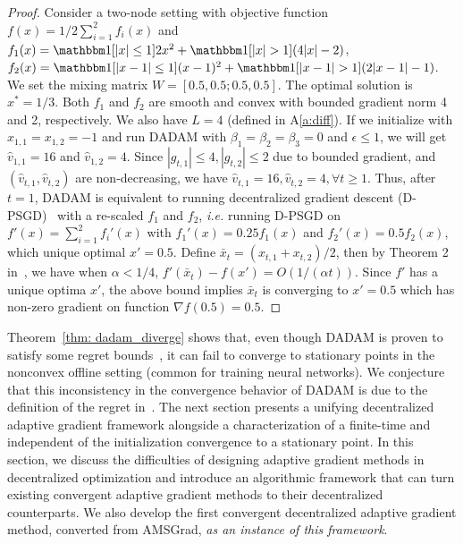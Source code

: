 \documentclass[anon,12pt]{colt2021} %
\begin{document}
\vspace{-0.05in}

\begin{proof}
Consider a two-node setting with objective function $f(x) =1/2 \sum_{i=1}^2 f_i(x)$ and $f_1(x) =  \mathbbm 1[|x|\leq 1] 2x^2 +  \mathbbm 1[|x|> 1] (4|x|-2)$, $f_2(x) =  \mathbbm 1[|x-1|\leq 1](x-1)^2 + \mathbbm 1[|x-1| > 1] (2|x-1|-1)$. We set the mixing matrix  $W = [0.5,0.5;0.5,0.5]$. The optimal solution is $x^* = 1/3$.
Both $f_1$ and $f_2$ are smooth and convex with bounded gradient norm 4 and 2, respectively. 
We also have $L = 4$ (defined in A\ref{a:diff}). 
If we initialize with $x_{1,1} = x_{1,2} = -1$ and run DADAM with $\beta_1 = \beta_2 =\beta_3 = 0$ and $\epsilon \leq 1$, we will get $\hat v_{1,1} = 16$ and $\hat v_{1,2} = 4$. 
Since $|g_{t,1}| \leq 4, |g_{t,2}| \leq 2$ due to bounded gradient, and $(\hat v_{t,1},\hat v_{t,2})$ are non-decreasing, we have $\hat v_{t,1} = 16, \hat v_{t,2}=4, \forall t \geq 1$. 
Thus, after $t=1$, DADAM is equivalent to running decentralized gradient descent (D-PSGD)~\cite{yuan2016convergence} with a re-scaled $f_1$ and $f_2$, \textit{i.e.} running D-PSGD on
$f'(x) = \sum_{i=1}^2 f_i'(x)$ with $f_1'(x) =  0.25 f_1(x)$ and $f_2'(x) = 0.5  f_2(x)$, which unique optimal $x'=0.5$. 
Define $\bar x_t = (x_{t,1}+x_{t,2})/2$, then by Theorem 2 in~\cite{yuan2016convergence}, we have when $\alpha < 1/4$, $f'(\bar x_t) - f(x') = O(1/(\alpha t))$. 
Since $f'$ has a unique optima $x'$, the above bound implies $\bar x_t$ is converging to $x'=0.5$ which has non-zero gradient on function $\nabla f(0.5) = 0.5$.
\end{proof}

Theorem~\ref{thm: dadam_diverge} shows that, even though DADAM is proven to satisfy some regret bounds~\cite{nazari2019dadam}, it can fail to converge to stationary points in the nonconvex offline setting (common for training neural networks). 
We conjecture that this inconsistency in the convergence behavior of DADAM is due to the definition of the regret in~\cite{nazari2019dadam}. 
The next section presents a unifying decentralized adaptive gradient framework alongside a characterization of a finite-time and independent of the initialization convergence to a stationary point.
In this section, we discuss the difficulties of designing adaptive gradient methods in decentralized optimization and introduce an algorithmic framework that can turn existing convergent adaptive gradient methods to their decentralized counterparts. 
We also develop the first convergent decentralized adaptive gradient method, converted from AMSGrad, \emph{as an instance of this  framework}.
\end{document}
